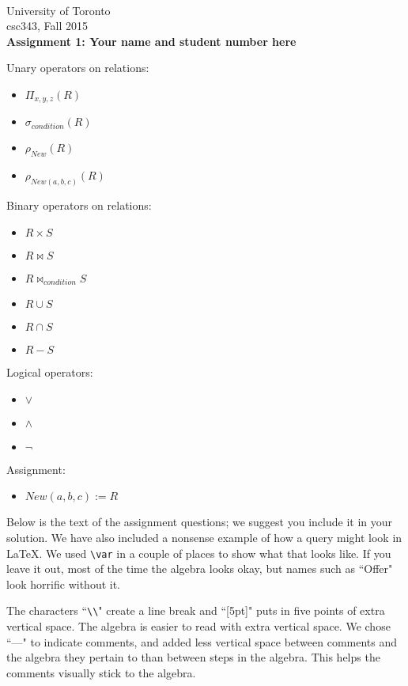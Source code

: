 \documentclass{article}
\newcommand{\var}[1]{\mathit{#1}}
\begin{document}
~~~\vspace{-2.0cm}

\noindent
University of Toronto\\
{\sc csc}343, Fall 2015\\[10pt]
{\LARGE\bf Assignment 1: Your name and student number here}

\noindent
Unary operators on relations:
\begin{itemize}
\item $\Pi_{x, y, z} (R)$
\item $\sigma_{condition} (R) $
\item $\rho_{New} (R) $
\item $\rho_{New(a, b, c)} (R) $
\end{itemize}
Binary operators on relations:
\begin{itemize}
\item $R \times S$
\item $R \bowtie S$
\item $R \bowtie_{condition} S$
\item $R \cup S$
\item $R \cap S$
\item $R - S$
\end{itemize}
Logical operators:
\begin{itemize}
\item $\vee$
\item $\wedge$
\item $\neg$
\end{itemize}
Assignment:
\begin{itemize}
\item $New(a, b, c) := R$
\end{itemize}

\noindent
Below is the text of the assignment questions; we suggest you include it in your solution.
We have also included a nonsense example of how a query might look in LaTeX.  
We used \verb|\var| in a couple of places to show what that looks like.  
If you leave it out, most of the time the algebra looks okay, but names
such as ``Offer" look horrific without it.

The characters ``\verb|\\|" create a line break and ``[5pt]" puts in 
five points of extra vertical space.  The algebra is easier to read with extra
vertical space.
We chose ``---" to indicate comments, and added less vertical space between comments
and the algebra they pertain to than between steps in the algebra.
This helps the comments visually stick to the algebra.
\end{document}
